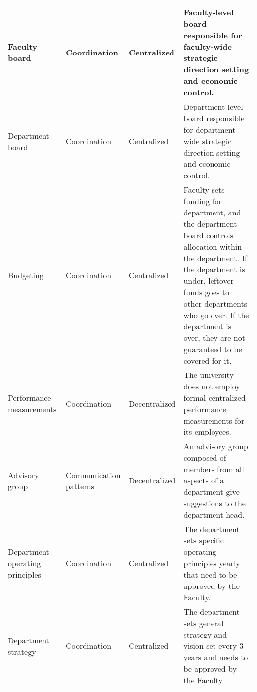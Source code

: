\begin{table}[H]
\begin{tabular}{ | p{} | p{}| p{} | p{}|}
 Faculty board &
 Coordination &
 Centralized &
 Faculty-level board responsible for faculty-wide strategic direction setting and economic control. \\
%
\hline
%
%
 Department board &
 Coordination &
 Centralized &
 Department-level board responsible for department-wide strategic direction setting and economic control. \\
%
\hline
%
 Budgeting &
 Coordination &
 Centralized &
 Faculty sets funding for department, and the department board controls allocation within the department. If the department is under, leftover funds goes to other departments who go over. If the department is over, they are not guaranteed to be covered for it. \\
%
\hline
%
%
 Performance measurements &
 Coordination &
 Decentralized &
 The university does not employ formal centralized performance measurements for its employees.  \\
%
\hline
%
 Advisory group &
 Communication patterns &
 Decentralized &
 An advisory group composed of members from all aspects of a department give suggestions to the department head. \\
%
\hline
%
%
 Department operating principles &
 Coordination &
 Centralized &
 The department sets specific operating principles  yearly that need to be approved by the Faculty. \\
%
\hline
%
%
 Department strategy &
 Coordination &
 Centralized &
 The department sets general strategy and vision set every 3 years and needs to be approved by the Faculty \\
%
\hline

\end{tabular}
\end{table}


